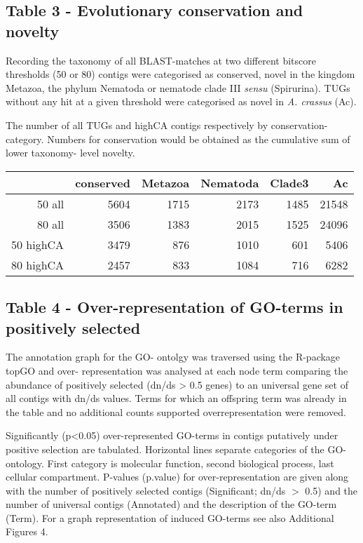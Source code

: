 \documentclass[10pt]{bmc_article}
\newenvironment{bmcformat}{\begin{raggedright}\baselineskip20pt\sloppy\setboolean{publ}{false}}{\end{raggedright}\baselineskip20pt\sloppy}
\begin{document}
\begin{bmcformat}
\subsection*{Table 3 - Evolutionary conservation and novelty}

Recording the taxonomy of all BLAST-matches at two different bitscore
thresholds (50 or 80) contigs were categorised as conserved, novel in
the kingdom Metazoa, the phylum Nematoda or nematode clade III
\textit{sensu} \cite{blaxter_molecular_1998} (Spirurina). TUGs without
any hit at a given threshold were categorised as novel in
\textit{A. crassus} (Ac).

The number of all TUGs and highCA contigs respectively by
conservation- category. Numbers for conservation would be obtained as
the cumulative sum of lower taxonomy- level novelty.

\vspace{1cm}

\begin{tabular}{rrrrrr}
  \hline
 & conserved & Metazoa & Nematoda & Clade3 & Ac \\ 
  \hline
50 all & 5604 & 1715 & 2173 & 1485 & 21548 \\ 
  80 all & 3506 & 1383 & 2015 & 1525 & 24096 \\ 
  50 highCA & 3479 & 876 & 1010 & 601 & 5406 \\ 
  80 highCA & 2457 & 833 & 1084 & 716 & 6282 \\ 
   \hline
\end{tabular}
\subsection*{Table 4 - Over-representation of GO-terms in positively
  selected}

The annotation graph for the GO- ontolgy was traversed using the
R-package topGO \cite{topGO} and over- representation was analysed at
each node term comparing the abundance of positively selected (dn/ds >
0.5 genes) to an universal gene set of all contigs with dn/ds
values. Terms for which an offspring term was already in the table and
no additional counts supported overrepresentation were removed.

Significantly (p<0.05) over-represented GO-terms in contigs putatively
under positive selection are tabulated. Horizontal lines separate
categories of the GO-ontology. First category is molecular function,
second biological process, last cellular compartment. P-values
(p.value) for over-representation are given along with the number of
positively selected contigs (Significant; dn/ds $>$ 0.5) and the
number of universal contigs (Annotated) and the description of the
GO-term (Term). For a graph representation of induced GO-terms see
also Additional Figures 4.


\end{bmcformat}
\end{document}
